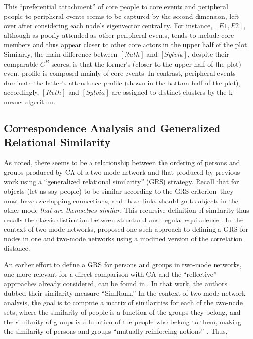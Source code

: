 \documentclass[a4paper,fleqn]{cas-sc}
\begin{document}
This ``preferential attachment'' \citep{barabasi1999emergence} of core people to core events and peripheral people to peripheral events seems to be captured by the second dimension, left over after considering each node's eigenvector centrality. For instance, $\left[E1, E2\right]$, although as poorly attended as other peripheral events, tends to include core members and thus appear closer to other core actors in the upper half of the plot. Similarly, the main difference between $\left[Ruth\right]$ and $\left[Sylvia\right]$, despite their comparable $C^B$ scores, is that the former's (closer to the upper half of the plot) event profile is composed mainly of core events. In contrast, peripheral events dominate the latter's attendance profile (shown in the bottom half of the plot), accordingly, $\left[Ruth\right]$ and $\left[Sylvia\right]$ are assigned to distinct clusters by the k-means algorithm. 

\subsection{Correspondence Analysis and Generalized Relational Similarity}
As noted, there seems to be a relationship between the ordering of persons and groups produced by CA of a two-mode network and that produced by previous work using a ``generalized relational similarity'' (GRS) strategy. Recall that for objects (let us say people) to be similar according to the GRS criterion, they must have overlapping connections, and those links should go to objects in the other mode \textit{that are themselves similar}. This recursive definition of similarity thus recalls the classic distinction between structural and regular equivalence \citep{everett1994regular}. In the context of two-mode networks, \citet{kovacs2010generalized} proposed one such approach to defining a GRS for nodes in one and two-mode networks using a modified version of the correlation distance.

An earlier effort to define a GRS for persons and groups in two-mode networks, one more relevant for a direct comparison with CA and the ``reflective'' approaches already considered, can be found in \citet{jeh2002simrank}. In that work, the authors dubbed their similarity measure ``SimRank.'' In the context of two-mode network analysis, the goal is to compute a matrix of similarities for each of the two-node sets, where the similarity of people is a function of the groups they belong, and the similarity of groups is a function of the people who belong to them, making the similarity of persons and groups ``mutually reinforcing notions'' \citep[540]{jeh2002simrank}. Thus,
\end{document}

